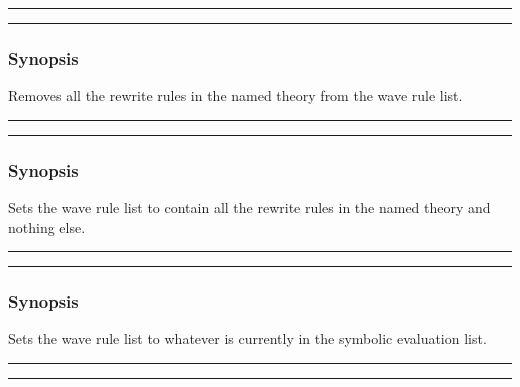 \vspace{2mm}
\hrule
\vspace{2mm}
\begin{Large}
\end{Large}
\vspace{2mm}
\hrule
\vspace{2mm}


\subsubsection*{Synopsis}
Removes all the rewrite rules in the named theory from the wave rule list.
\vspace{2mm}
\hrule
\vspace{2mm}
\begin{Large}
\end{Large}
\vspace{2mm}
\hrule
\vspace{2mm}


\subsubsection*{Synopsis}
Sets the wave rule list to contain all the rewrite rules in
the named theory and nothing else.

\vspace{2mm}
\hrule
\vspace{2mm}
\begin{Large}
\end{Large}
\vspace{2mm}
\hrule
\vspace{2mm}


\subsubsection*{Synopsis}
Sets the wave rule list to whatever is currently in the symbolic
evaluation list.  

\vspace{2mm}
\hrule
\vspace{2mm}
\begin{Large}
\end{Large}
\vspace{2mm}
\hrule
\vspace{2mm}

